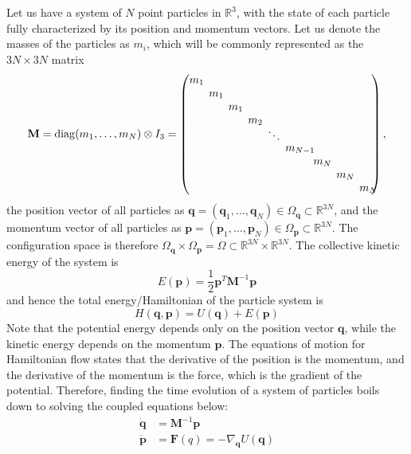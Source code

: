\documentclass{article}
\begin{document}
    Let us have a system of $N$ point particles in $\mathbb{R}^3$, with the state of each particle fully characterized by its position and momentum vectors. Let us denote the masses of the particles as $m_i$, which will be commonly represented as the $3N \times 3N$ matrix  
    \begin{equation}
      \mathbf{M} = \mathrm{diag}(m_1, \ldots, m_N) \otimes I_3 = \begin{pmatrix}
      m_1\hspace{-2mm}& & & & & & & & \\ 
      & m_1\hspace{-2mm}& & & & & & & \\ 
      & & m_1\hspace{-2mm}& & & & & & \\ 
      & & & m_2 \hspace{-2mm}& & & & & \\[-1mm] 
      & & & & \ddots \hspace{-2mm} & & & & \\[-1mm] 
      & & & & & m_{N-1}\hspace{-4mm} & & & \\ 
      & & & & & & m_N \hspace{-2mm}& & \\ 
      & & & & & & & m_N\hspace{-2mm} & \\ 
      & & & & & & & & m_N\hspace{-2mm} \end{pmatrix},
    \end{equation}
    the position vector of all particles as $\mathbf{q} = (\mathbf{q}_1, \ldots, \mathbf{q}_N) \in \Omega_\mathbf{q} \subset \mathbb{R}^{3N}$, and the momentum vector of all particles as $\mathbf{p} = (\mathbf{p}_1, \ldots, \mathbf{p}_N) \in \Omega_\mathbf{p} \subset \mathbb{R}^{3N}$. The configuration space is therefore $\Omega_\mathbf{q} \times \Omega_\mathbf{p} = \Omega \subset \mathbb{R}^{3N} \times \mathbb{R}^{3N}$. The collective kinetic energy of the system is 
    \begin{equation}
      E (\mathbf{p}) = \frac{1}{2} \mathbf{p}^T \mathbf{M}^{-1} \mathbf{p}
    \end{equation}
    and hence the total energy/Hamiltonian of the particle system is 
    \begin{equation}
      H(\mathbf{q}, \mathbf{p}) = U(\mathbf{q}) + E(\mathbf{p})
    \end{equation}
    Note that the potential energy depends only on the position vector $\mathbf{q}$, while the kinetic energy depends on the momentum $\mathbf{p}$. The equations of motion for Hamiltonian flow states that the derivative of the position is the momentum, and the derivative of the momentum is the force, which is the gradient of the potential. Therefore, finding the time evolution of a system of particles boils down to solving the coupled equations below: 
    \begin{align*}
      \boldsymbol{\dot{q}} & = \mathbf{M}^{-1} \mathbf{p} \\
      \boldsymbol{\dot{p}} & = \mathbf{F}(q) = - \nabla_\mathbf{q} U(\mathbf{q})
    \end{align*}
\end{document}
